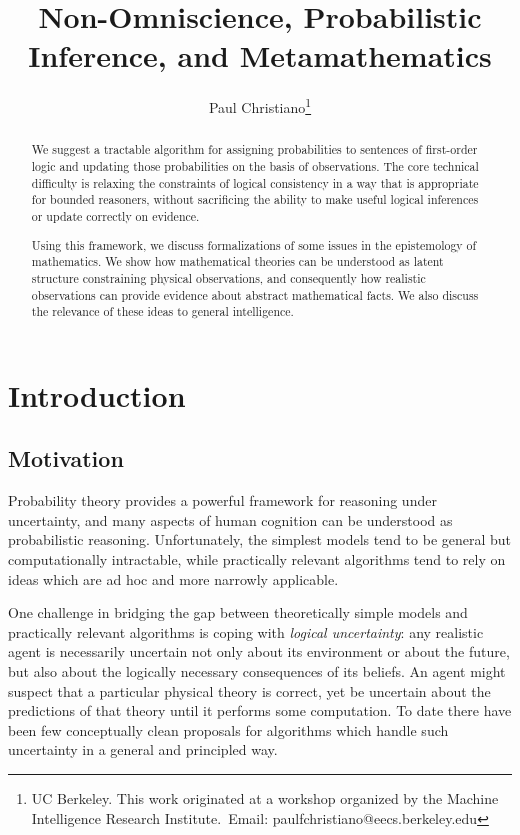 \documentclass[12pt]{article}
\theoremstyle{definition}
\begin{document}
\title{Non-Omniscience, Probabilistic Inference, and Metamathematics}
\author{
Paul Christiano\thanks{UC Berkeley. This work originated at a workshop organized by the Machine Intelligence Research Institute.\ Email: paulfchristiano@eecs.berkeley.edu}
}
\maketitle


\begin{abstract}
We suggest a tractable algorithm for assigning probabilities
to sentences of first-order logic and updating those probabilities
on the basis of observations.
The core technical difficulty is relaxing the constraints
of logical consistency in a way that is appropriate for bounded reasoners,
without sacrificing the ability to make useful logical inferences
or update correctly on evidence.

Using this framework, we discuss formalizations of some
issues in the epistemology of mathematics.
We show how mathematical theories can be understood as latent structure
constraining physical observations, and consequently how realistic
observations can provide evidence about abstract mathematical facts.
We also discuss the relevance of these ideas to general intelligence.
\end{abstract}

\tableofcontents
\section{Introduction}

\subsection{Motivation}

Probability theory provides a powerful framework
for reasoning under uncertainty, 
and many aspects of human cognition can be understood
as probabilistic reasoning.
Unfortunately, the simplest models tend to be general but computationally intractable,
while practically relevant algorithms tend to rely on ideas which are 
ad hoc and more narrowly applicable.

One challenge in bridging the gap between theoretically simple
models and practically relevant algorithms is coping
with \emph{logical uncertainty}:
any realistic agent is necessarily uncertain not only about its
environment or about the future, 
but also about the logically necessary consequences of its beliefs.
An agent might suspect that a particular physical theory is correct,
yet be uncertain about the predictions of that theory until it
performs some computation.
To date there have been few conceptually clean proposals for algorithms
which handle such uncertainty in a general and principled way.
\end{document}
